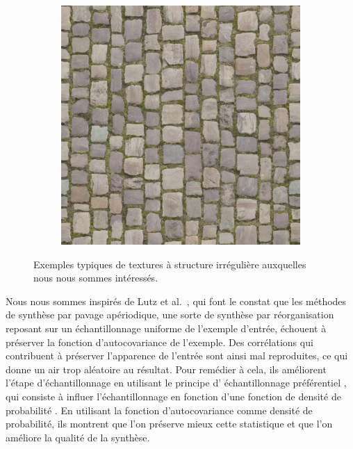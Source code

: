 \begin{figure}
\begin{subfigure}{.3\textwidth}
    \end{subfigure}
    \hfill
    \begin{subfigure}{.3\textwidth}
        \centering
        \includegraphics[width=\textwidth]{contenu/resources/images/texture_3}
    \end{subfigure}

    \caption{Exemples typiques de textures à structure irrégulière auxquelles nous nous sommes intéressés.}
    \label{fig:typical-textures}
\end{figure}


Nous nous sommes inspirés de Lutz et al.~\cite{lutz_preserving_2023}, qui font le constat que les méthodes de synthèse par pavage apériodique, une sorte de synthèse par réorganisation reposant sur un échantillonnage uniforme de l'exemple d'entrée, échouent à préserver la fonction d'autocovariance de l'exemple. Des corrélations qui contribuent à préserver l'apparence de l'entrée sont ainsi mal reproduites, ce qui donne un air trop aléatoire au résultat. Pour remédier à cela, ils améliorent l'étape d'échantillonnage en utilisant le principe d' \og échantillonnage préférentiel \fg{}, qui consiste à influer l'échantillonnage en fonction d'une \og fonction de densité de probabilité \fg{}. En utilisant la fonction d'autocovariance comme densité de probabilité, ils montrent que l'on préserve mieux cette statistique et que l'on améliore la qualité de la synthèse.


